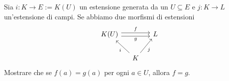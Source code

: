 \begin{eser}
Sia \(i : K \to E := K(U)\) un estensione generata da un \(U \subseteq E\) e \(j : K \to L\) un'estensione di campi. Se abbiamo due morfismi di estensioni
\[\begin{tikzcd}[column sep=small]
K(U) \ar["f", rr, shift left] \ar["g", shift right, rr, swap] & & L \\
& K \ar["i", ul] \ar["j", ur, swap] 
\end{tikzcd}\]
Mostrare che se \(f(a) = g(a)\) per ogni \(a \in U\), allora \(f = g\).
\end{eser}

